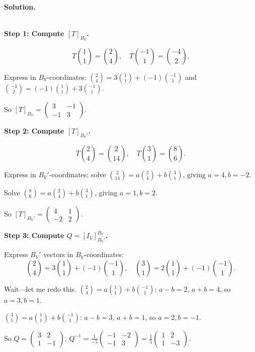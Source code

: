 \documentclass{article}
\begin{document}
\noindent\\
\textbf{Solution.}\\
\quad\\
\begin{mdframed}[linewidth=1pt]
\textbf{Step 1: Compute $[T]_{B_V}$.}

\[
T\binom{1}{1} = \binom{2}{4}, \quad T\binom{-1}{1} = \binom{-4}{2}.
\]

Express in $B_V$-coordinates: $\binom{2}{4} = 3\binom{1}{1} + (-1)\binom{-1}{1}$ and $\binom{-4}{2} = (-1)\binom{1}{1} + 3\binom{-1}{1}$.

So $[T]_{B_V} = \begin{pmatrix} 3 & -1 \\ -1 & 3 \end{pmatrix}$.

\medskip
\textbf{Step 2: Compute $[T]_{B_V'}$.}

\[
T\binom{2}{4} = \binom{2}{14}, \quad T\binom{3}{1} = \binom{8}{6}.
\]

Express in $B_V'$-coordinates: solve $\binom{2}{14} = a\binom{2}{4} + b\binom{3}{1}$, giving $a = 4, b = -2$.

Solve $\binom{8}{6} = a\binom{2}{4} + b\binom{3}{1}$, giving $a = 1, b = 2$.

So $[T]_{B_V'} = \begin{pmatrix} 4 & 1 \\ -2 & 2 \end{pmatrix}$.

\medskip
\textbf{Step 3: Compute $Q = [I_V]_{B_V'}^{B_V}$.}

Express $B_V'$ vectors in $B_V$-coordinates:
\[
\binom{2}{4} = 3\binom{1}{1} + (-1)\binom{-1}{1}, \quad \binom{3}{1} = 2\binom{1}{1} + (-1)\binom{-1}{1}.
\]

Wait---let me redo this. $\binom{2}{4} = a\binom{1}{1} + b\binom{-1}{1}$: $a - b = 2$, $a + b = 4$, so $a = 3, b = 1$.

$\binom{3}{1} = a\binom{1}{1} + b\binom{-1}{1}$: $a - b = 3$, $a + b = 1$, so $a = 2, b = -1$.

So $Q = \begin{pmatrix} 3 & 2 \\ 1 & -1 \end{pmatrix}$, \quad $Q^{-1} = \frac{1}{-5}\begin{pmatrix} -1 & -2 \\ -1 & 3 \end{pmatrix} = \frac{1}{5}\begin{pmatrix} 1 & 2 \\ 1 & -3 \end{pmatrix}$.


\end{mdframed}
\end{document}
